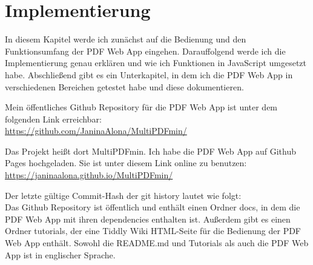 \chapter{Implementierung}
In diesem Kapitel werde ich zunächst auf die Bedienung und den Funktionsumfang der PDF Web App eingehen. Darauffolgend werde ich die Implementierung genau erklären und wie ich Funktionen in JavaScript umgesetzt habe. Abschließend gibt es ein Unterkapitel, in dem ich die PDF Web App in verschiedenen Bereichen getestet habe und diese dokumentieren.

Mein öffentliches Github Repository für die PDF Web App ist unter dem folgenden Link erreichbar: \\
\url{https://github.com/JaninaAlona/MultiPDFmin/}

Das Projekt heißt dort MultiPDFmin. Ich habe die PDF Web App auf Github Pages hochgeladen. Sie ist unter diesem Link online zu benutzen: \\
\url{https://janinaalona.github.io/MultiPDFmin/}

Der letzte gültige Commit-Hash der git history lautet wie folgt: \\

Das Github Repository ist öffentlich und enthält einen Ordner docs, in dem die PDF Web App mit ihren dependencies enthalten ist. Außerdem gibt es einen Ordner tutorials, der eine Tiddly Wiki HTML-Seite für die Bedienung der PDF Web App enthält. Sowohl die README.md und Tutorials als auch die PDF Web App ist in englischer Sprache.



